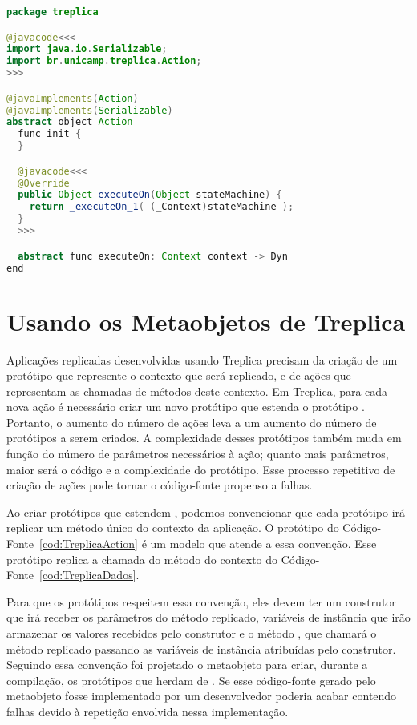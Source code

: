 \begin{lstlisting}[language=Java, caption={Código Fonte de \textbf{Action}}, label={cod:TCyanAction}]
package treplica

@javacode<<<
import java.io.Serializable;
import br.unicamp.treplica.Action;
>>>

@javaImplements(Action)
@javaImplements(Serializable)
abstract object Action
  func init {
  }

  @javacode<<<
  @Override 
  public Object executeOn(Object stateMachine) {
    return _executeOn_1( (_Context)stateMachine );
  }
  >>>

  abstract func executeOn: Context context -> Dyn
end

\end{lstlisting}

\section{Usando os Metaobjetos de Treplica}
\label{sec:treplicacyanmeta}

Aplicações replicadas desenvolvidas usando Treplica precisam da criação de um protótipo que represente o contexto que será replicado, e de ações que representam as chamadas de métodos deste contexto. Em Treplica, para cada nova ação é necessário criar um novo protótipo que estenda o protótipo . Portanto, o aumento do número de ações leva a um aumento do número de protótipos a serem criados. A complexidade desses protótipos também muda em função do número de parâmetros necessários à ação; quanto mais parâmetros, maior será o código e a complexidade do protótipo. Esse processo repetitivo de criação de ações pode tornar o código-fonte propenso a falhas.

Ao criar protótipos que estendem , podemos convencionar que cada protótipo irá replicar um método único do contexto da aplicação. O protótipo  do Código-Fonte~\ref{cod:TreplicaAction} é um modelo que atende a essa convenção. Esse protótipo replica a chamada do método  do contexto do Código-Fonte~\ref{cod:TreplicaDados}.

Para que os protótipos respeitem essa convenção, eles devem ter um construtor que irá receber os parâmetros do método replicado, variáveis de instância que irão armazenar os valores recebidos pelo construtor e o método , que chamará o método replicado passando as variáveis de instância atribuídas pelo construtor. Seguindo essa convenção foi projetado o metaobjeto  para criar, durante a compilação, os protótipos que herdam de . Se esse código-fonte gerado pelo metaobjeto fosse implementado por um desenvolvedor poderia acabar contendo falhas devido à repetição envolvida nessa implementação.

